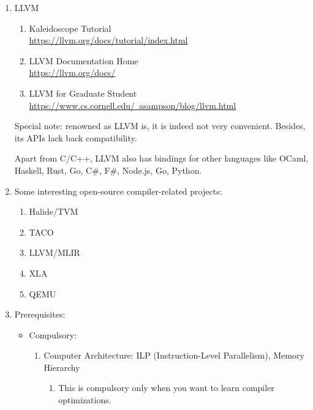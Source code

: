 \documentclass{article}
\begin{document}
\begin{enumerate}
    \item LLVM
    \begin{enumerate}
        \item Kaleidoscope Tutorial\\
        \href{https://llvm.org/docs/tutorial/index.html}{https://llvm.org/docs/tutorial/index.html}
        \item LLVM Documentation Home\\
        \href{https://llvm.org/docs/}{https://llvm.org/docs/}
        \item LLVM for Graduate Student\\
        \href{https://www.cs.cornell.edu/~asampson/blog/llvm.html}{https://www.cs.cornell.edu/~asampson/blog/llvm.html}
    \end{enumerate}    
    Special note: renowned as LLVM is, it is indeed not very convenient. Besides, its APIs lack back compatibility.

    Apart from C/C++, LLVM also has bindings for other languages like OCaml, Haskell, Rust, Go, C\#, F\#, Node.js, Go, Python.

    \item Some interesting open-source compiler-related projects:
    \begin{enumerate}
        \item Halide/TVM
        \item TACO
        \item LLVM/MLIR
        \item XLA
        \item QEMU
    \end{enumerate}

    \item Prerequisites:
    \begin{itemize}
        \item Compulsory:
        \begin{enumerate}
        \item Computer Architecture: ILP (Instruction-Level Parallelism), Memory Hierarchy
        \begin{enumerate}
            \item This is compulsory only when you want to learn compiler optimizations.
        \end{enumerate}
        

\end{enumerate}
\end{itemize}
\end{enumerate}
\end{document}

